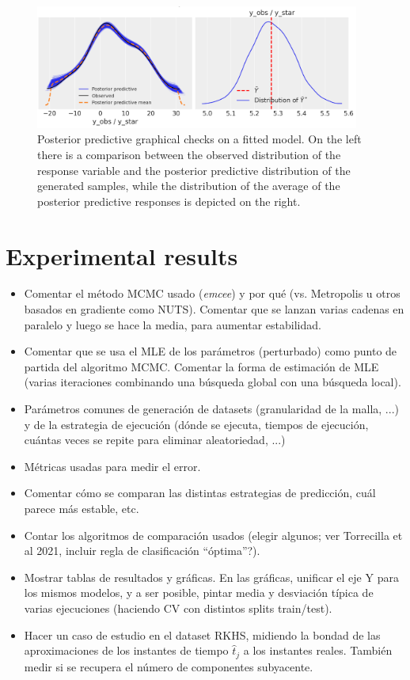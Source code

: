 \documentclass[ba]{imsart}
\numberwithin{equation}{section}
\theoremstyle{plain}
\newenvironment{comment}[1][comment-red]
{
\noindent \color{#1}
}
{
\color{black}
}
\begin{document}
\begin{figure}[h]
  \centering
  \includegraphics[width=0.95\textwidth]{img/ppc_lin}
  \caption{Posterior predictive graphical checks on a fitted model. On the left there is a comparison between the observed distribution of the response variable and the posterior predictive distribution of the generated samples, while the distribution of the average of the posterior predictive responses is depicted on the right.}\label{fig:ppc}
\end{figure}

\section{Experimental results}\label{sec:results}
\begin{comment}
  \begin{itemize}
    \item Comentar el método MCMC usado (\textit{emcee}) y por qué (vs. Metropolis u otros basados en gradiente como NUTS). Comentar que se lanzan varias cadenas en paralelo y luego se hace la media, para aumentar estabilidad.
    \item Comentar que se usa el MLE de los parámetros (perturbado) como punto de partida del algoritmo MCMC. Comentar la forma de estimación de MLE (varias iteraciones combinando una búsqueda global con una búsqueda local).
    \item Parámetros comunes de generación de datasets (granularidad de la malla, ...) y de la estrategia de ejecución (dónde se ejecuta, tiempos de ejecución, cuántas veces se repite para eliminar aleatoriedad, ...)
    \item Métricas usadas para medir el error.
    \item Comentar cómo se comparan las distintas estrategias de predicción, cuál parece más estable, etc.
    \item Contar los algoritmos de comparación usados (elegir algunos; ver Torrecilla et al 2021, incluir regla de clasificación ``óptima''?).
    \item Mostrar tablas de resultados y gráficas. En las gráficas, unificar el eje Y para los mismos modelos, y a ser posible, pintar media y desviación típica de varias ejecuciones (haciendo CV con distintos splits train/test).
    \item Hacer un caso de estudio en el dataset RKHS, midiendo la bondad de las aproximaciones de los instantes de tiempo \(\hat t_j\) a los instantes reales. También medir si se recupera el número de componentes subyacente.
\end{itemize}
\end{comment}
\end{document}
